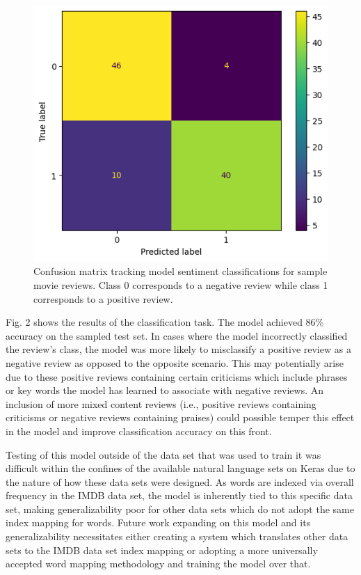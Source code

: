\documentclass[sigplan]{acmart}
\begin{document}
\begin{figure}[h]
  \centering
  \includegraphics[width=\linewidth]{confusion.png}
  \caption{Confusion matrix tracking model sentiment classifications for sample movie reviews. Class 0 corresponds to a negative review while class 1 corresponds to a positive review.}
\end{figure}

Fig. 2 shows the results of the classification task. The model achieved 86\% accuracy on the sampled test set. In cases where the model incorrectly classified the review's class, the model was more likely to misclassify a positive review as a negative review as opposed to the opposite scenario. This may potentially arise due to these positive reviews containing certain criticisms which include phrases or key words the model has learned to associate with negative reviews. An inclusion of more mixed content reviews (i.e., positive reviews containing criticisms or negative reviews containing praises) could possible temper this effect in the model and improve classification accuracy on this front.

Testing of this model outside of the data set that was used to train it was difficult within the confines of the available natural language sets on Keras due to the nature of how these data sets were designed. As words are indexed via overall frequency in the IMDB data set, the model is inherently tied to this specific data set, making generalizability poor for other data sets which do not adopt the same index mapping for words. Future work expanding on this model and its generalizability necessitates either creating a system which translates other data sets to the IMDB data set index mapping or adopting a more universally accepted word mapping methodology and training the model over that.
\end{document}
